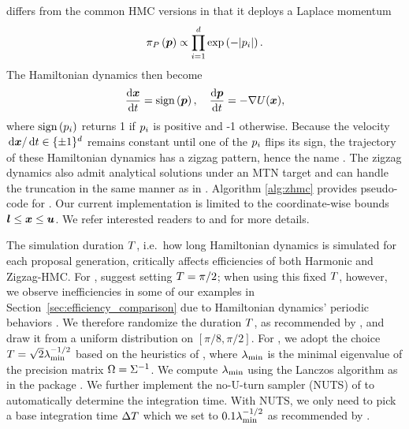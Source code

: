 \zhmc differs from the common HMC versions in that it deploys a Laplace momentum  \citep{nishimura2020discontinuous, nishimura2024zigzag} 
	\begin{equation}
			\pi_P\left(\bm{p}\right) \propto \prod_{i=1}^d \exp\left(-|p_i|\right).
	\end{equation}
The Hamiltonian dynamics then become
\begin{equation}
\label{eq:hzz_equation}
\frac{{\rm d} \bm{x}}{{\rm d} t}
=   \text{sign}\left(\bm{p}\right), \quad
\frac{{\rm d} \bm{p}}{{\rm d} t} = - \nabla U(\bm{x}),
\end{equation}
where $\text{sign}\left(p_i\right)$ returns 1 if $p_i$ is positive and -1 otherwise.
Because the velocity $\, {\rm d} \bm{x} / \, {\rm d} t \in \{\pm 1\}^d$ remains constant until one of the $ p_i $ flips its sign, the trajectory of these Hamiltonian dynamics has a zigzag pattern, hence the name \zhmc.
The zigzag dynamics also admit analytical solutions under an MTN target and can handle the truncation in the same manner as in \hhmc.
Algorithm \ref{alg:zhmc} provides pseudo-code for \zhmc. Our current \zhmc implementation is limited to the coordinate-wise bounds $\bm{l} \leq \bm{x} \leq \bm{u}$. We refer interested readers to \citet{nishimura2024zigzag} and \citet{zhang2023accelerating} for more details.

The simulation duration $T$, i.e.\ how long Hamiltonian dynamics is simulated for each proposal generation, critically affects efficiencies of both Harmonic and Zigzag-HMC.
For \hhmc, \citet{pakman2014exact} suggest setting $ T = \pi/2 $;
when using this fixed $ T $, however, we observe inefficiencies in some of our examples in Section~\ref{sec:efficiency_comparison} due to Hamiltonian dynamics' periodic behaviors \citep{hmcneal}.
We therefore randomize the duration $T$, as recommended by \citet{hmcneal}, and draw it from a uniform distribution on $ \left[\pi/8,\pi/2\right] $. 
For \zhmc, we adopt the choice $ T =  \sqrt{2} \lambda_{\text{min}}^{-1/2}$ based on the heuristics of \cite{nishimura2024zigzag}, where $\lambda_{\text{min}} $ is the minimal eigenvalue of the precision matrix $ \Omega = \Sigma^{-1} $.
We compute $\lambda_{\text{min}} $ using the Lanczos algorithm \citep{demmel1997applied} as in the  package \citep{mgcvcite}.
We further implement the no-U-turn sampler (NUTS) of \citet{hoffman2014nuts} to automatically determine
the integration time. 
With NUTS, we only need to pick a base integration time $ \Delta T $ which we set to $0.1 \lambda_{\text{min}}^{-1/2}$
as recommended by \citet{nishimura2024zigzag}.

